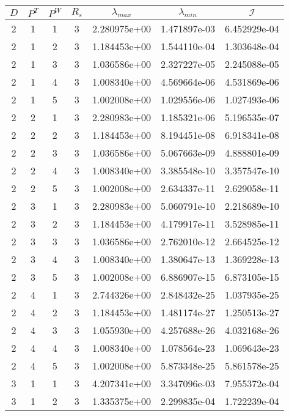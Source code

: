 \documentclass{article}
\newcommand{\cali}{\mathcal{I}}
\begin{document}
\begin{small}
\begin{table}
\begin{center}
\begin{tabular}{|cccc|ccc|} \hline
$D$ & $P^T$  & $P^W$ & $R_s$ & $\lambda_{max}$ & $\lambda_{min}$   & $\cali$ \\
\hline
2 & 1 & 1 & 3 & 2.280975e+00 & 1.471897e-03 & 6.452929e-04 \\ 
2 & 1 & 2 & 3 & 1.184453e+00 & 1.544110e-04 & 1.303648e-04 \\ 
2 & 1 & 3 & 3 & 1.036586e+00 & 2.327227e-05 & 2.245088e-05 \\ 
2 & 1 & 4 & 3 & 1.008340e+00 & 4.569664e-06 & 4.531869e-06 \\ 
2 & 1 & 5 & 3 & 1.002008e+00 & 1.029556e-06 & 1.027493e-06 \\
\hline
2 & 2 & 1 & 3 & 2.280983e+00 & 1.185321e-06 & 5.196535e-07 \\ 
2 & 2 & 2 & 3 & 1.184453e+00 & 8.194451e-08 & 6.918341e-08 \\ 
2 & 2 & 3 & 3 & 1.036586e+00 & 5.067663e-09 & 4.888801e-09 \\ 
2 & 2 & 4 & 3 & 1.008340e+00 & 3.385548e-10 & 3.357547e-10 \\ 
2 & 2 & 5 & 3 & 1.002008e+00 & 2.634337e-11 & 2.629058e-11 \\ 
\hline
2 & 3 & 1 & 3 & 2.280983e+00 & 5.060791e-10 & 2.218689e-10 \\ 
2 & 3 & 2 & 3 & 1.184453e+00 & 4.179917e-11 & 3.528985e-11 \\ 
2 & 3 & 3 & 3 & 1.036586e+00 & 2.762010e-12 & 2.664525e-12 \\ 
2 & 3 & 4 & 3 & 1.008340e+00 & 1.380647e-13 & 1.369228e-13 \\ 
2 & 3 & 5 & 3 & 1.002008e+00 & 6.886907e-15 & 6.873105e-15 \\ 
\hline
2 & 4 & 1 & 3 & 2.744326e+00 & 2.848432e-25 & 1.037935e-25 \\ 
2 & 4 & 2 & 3 & 1.184453e+00 & 1.481174e-27 & 1.250513e-27 \\ 
2 & 4 & 3 & 3 & 1.055930e+00 & 4.257688e-26 & 4.032168e-26 \\ 
2 & 4 & 4 & 3 & 1.008340e+00 & 1.078564e-23 & 1.069643e-23 \\ 
2 & 4 & 5 & 3 & 1.002008e+00 & 5.873348e-25 & 5.861578e-25 \\ 
\hline
3 & 1 & 1 & 3 & 4.207341e+00 & 3.347096e-03 & 7.955372e-04 \\ 
3 & 1 & 2 & 3 & 1.335375e+00 & 2.299835e-04 & 1.722239e-04 \\ 

\end{tabular}
\end{center}
\end{table}
\end{small}
\end{document}

